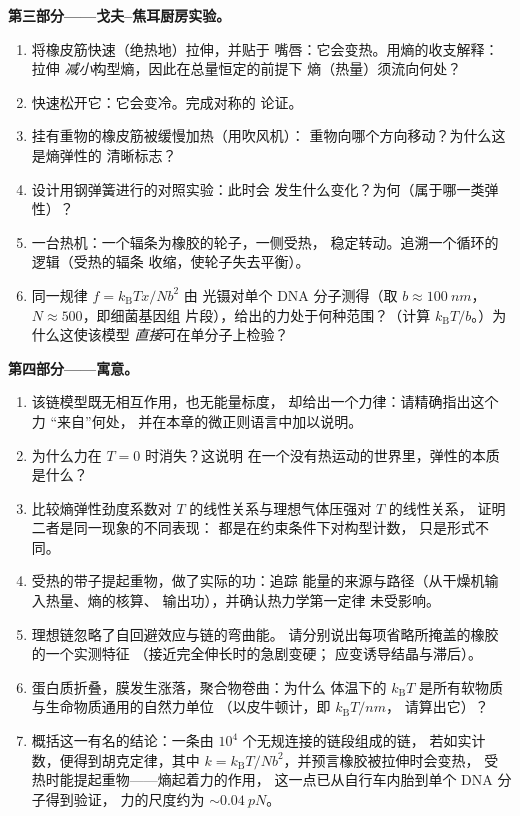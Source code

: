 \begin{problem}
\medskip\noindent\textbf{第三部分——戈夫–焦耳厨房实验。}
\begin{enumerate}[resume]
  \item 将橡皮筋快速（绝热地）拉伸，并贴于
        嘴唇：它会变热。用熵的收支解释：拉伸
        \emph{减小}构型熵，因此在总量恒定的前提下
        熵（热量）须流向何处？
  \item 快速松开它：它会变冷。完成对称的
        论证。
  \item 挂有重物的橡皮筋被缓慢加热（用吹风机）：
        重物向哪个方向移动？为什么这是熵弹性的
        清晰标志？
  \item 设计用钢弹簧进行的对照实验：此时会
        发生什么变化？为何（属于哪一类弹性）？
  \item 一台热机：一个辐条为橡胶的轮子，一侧受热，
        稳定转动。追溯一个循环的逻辑（受热的辐条
        收缩，使轮子失去平衡）。
  \item 同一规律 $f = k_{\text{B}}Tx/Nb^2$ 由
        光镊对单个 DNA 分子测得（取 $b \approx
        \qty{100}{nm}$，$N \approx 500$，即细菌基因组
        片段），给出的力处于何种范围？（计算
        $k_{\text{B}}T/b$。）为什么这使该模型
        \emph{直接}可在单分子上检验？
\end{enumerate}

\medskip\noindent\textbf{第四部分——寓意。}
\begin{enumerate}[resume]
  \item 该链模型既无相互作用，也无能量标度，
        却给出一个力律：请精确指出这个力
        “来自”何处，
        并在本章的微正则语言中加以说明。
  \item 为什么力在 $T = 0$ 时消失？这说明
        在一个没有热运动的世界里，弹性的本质
        是什么？
  \item 比较熵弹性劲度系数对 $T$ 的线性关系与理想气体压强对 $T$ 的线性关系，
        证明二者是同一现象的不同表现：
        都是在约束条件下对构型计数，
        只是形式不同。
  \item 受热的带子提起重物，做了实际的功：追踪
        能量的来源与路径（从干燥机输入热量、熵的核算、
        输出功），并确认热力学第一定律
        未受影响。
  \item 理想链忽略了自回避效应与链的弯曲能。
        请分别说出每项省略所掩盖的橡胶的一个实测特征
        （接近完全伸长时的急剧变硬；
        应变诱导结晶与滞后）。
  \item 蛋白质折叠，膜发生涨落，聚合物卷曲：为什么
        体温下的 $k_{\text{B}}T$ 是所有软物质与生命物质通用的自然力单位
        （以皮牛顿计，即 $k_{\text{B}}T/\unit{nm}$，
        请算出它）？
  \item 概括这一有名的结论：一条由 $10^4$ 个无规连接的链段组成的链，
        若如实计数，便得到胡克定律，其中 $k =
        k_{\text{B}}T/Nb^2$，并预言橡胶被拉伸时会变热，
        受热时能提起重物——熵起着力的作用，
        这一点已从自行车内胎到单个 DNA 分子得到验证，
        力的尺度约为 $\sim\qty{0.04}{pN}$。
\end{enumerate}
\end{problem}
